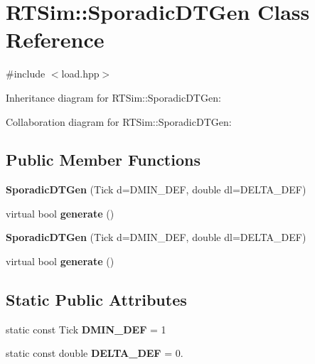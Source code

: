 \hypertarget{classRTSim_1_1SporadicDTGen}{}\section{R\+T\+Sim\+:\+:Sporadic\+D\+T\+Gen Class Reference}
\label{classRTSim_1_1SporadicDTGen}


{\ttfamily \#include $<$load.\+hpp$>$}



Inheritance diagram for R\+T\+Sim\+:\+:Sporadic\+D\+T\+Gen\+:


Collaboration diagram for R\+T\+Sim\+:\+:Sporadic\+D\+T\+Gen\+:
\subsection*{Public Member Functions}
\begin{DoxyCompactItemize}
\item 
{\bfseries Sporadic\+D\+T\+Gen} (Tick d=D\+M\+I\+N\+\_\+\+D\+EF, double dl=D\+E\+L\+T\+A\+\_\+\+D\+EF)\hypertarget{classRTSim_1_1SporadicDTGen_a10417f51dfae93256e960774eddbcdec}{}\label{classRTSim_1_1SporadicDTGen_a10417f51dfae93256e960774eddbcdec}

\item 
virtual bool {\bfseries generate} ()\hypertarget{classRTSim_1_1SporadicDTGen_aad6dde9e8a8ab8ba7600f427075a94a2}{}\label{classRTSim_1_1SporadicDTGen_aad6dde9e8a8ab8ba7600f427075a94a2}

\item 
{\bfseries Sporadic\+D\+T\+Gen} (Tick d=D\+M\+I\+N\+\_\+\+D\+EF, double dl=D\+E\+L\+T\+A\+\_\+\+D\+EF)\hypertarget{classRTSim_1_1SporadicDTGen_a10417f51dfae93256e960774eddbcdec}{}\label{classRTSim_1_1SporadicDTGen_a10417f51dfae93256e960774eddbcdec}

\item 
virtual bool {\bfseries generate} ()\hypertarget{classRTSim_1_1SporadicDTGen_af5794b88aee4b80b03405e4a714be74c}{}\label{classRTSim_1_1SporadicDTGen_af5794b88aee4b80b03405e4a714be74c}

\end{DoxyCompactItemize}
\subsection*{Static Public Attributes}
\begin{DoxyCompactItemize}
\item 
static const Tick {\bfseries D\+M\+I\+N\+\_\+\+D\+EF} = 1\hypertarget{classRTSim_1_1SporadicDTGen_a618c4568062e2eb43e4351b35f0f799b}{}\label{classRTSim_1_1SporadicDTGen_a618c4568062e2eb43e4351b35f0f799b}

\item 
static const double {\bfseries D\+E\+L\+T\+A\+\_\+\+D\+EF} = 0.\hypertarget{classRTSim_1_1SporadicDTGen_a2d41ccbad301f591dacd700d44560e35}{}\label{classRTSim_1_1SporadicDTGen_a2d41ccbad301f591dacd700d44560e35}

\end{DoxyCompactItemize}
